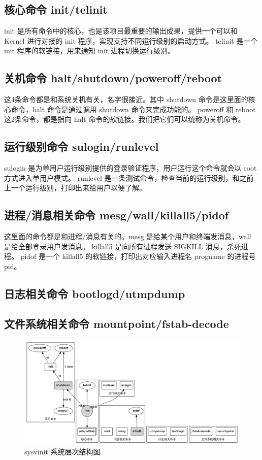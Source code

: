\subsection{核心命令 init/telinit}

init 是所有命令中的核心，也是该项目最重要的输出成果，提供一个可以和 Kernel
进行对接的 init 程序，实现支持不同运行级别的启动方式。 telinit 是一个
init 程序的软链接，用来通知 init 进程切换运行级别。

\subsection{关机命令 halt/shutdown/poweroff/reboot}

这4条命令都是和系统关机有关，名字很接近。其中 shutdown
命令是这里面的核心命令，halt 命令是通过调用 shutdown 命令来完成功能的。
poweroff 和 reboot 这2条命令，都是指向 halt
命令的软链接。我们把它们可以统称为关机命令。

\subsection{运行级别命令 sulogin/runlevel}

sulogin 是为单用户运行级别提供的登录验证程序，用户运行这个命令就会以 root
方式进入单用户模式。 runlevel
是一条测试命令，检查当前的运行级别，和之前上一个运行级别，打印出来给用户以便了解。

\subsection{进程/消息相关命令 mesg/wall/killall5/pidof}

这里面的命令都是和进程/消息有关的。mesg 是给某个用户和终端发消息，wall
是给全部登录用户发消息。 killall5 是向所有进程发送 SIGKILL
消息，杀死进程。 pidof 是一个 killall5 的软链接，打印出对应输入进程名
progname 的进程号 pid。

\subsection{日志相关命令 bootlogd/utmpdump}

\subsection{文件系统相关命令 mountpoint/fstab-decode}

\begin{figure}[htbp]
\centering
\includegraphics{./figures/sys.png}
\caption{sysvinit 系统层次结构图}
\end{figure}

